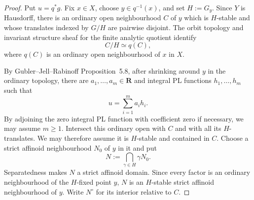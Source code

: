\begin{proof}
Put $u=q^*g$.  Fix $x\in X$, choose $y\in q^{-1}(x)$, and set
$H:=G_y$.  Since $Y$ is Hausdorff, there is an ordinary open neighbourhood
$C$ of $y$ which is $H$-stable and whose translates indexed by $G/H$ are
pairwise disjoint.  The orbit topology and invariant structure sheaf for the
finite analytic quotient identify
\begin{equation}\label{eq:p061-clean-local-quotient-candidate}
                         C/H\simeq q(C),
\end{equation}
where $q(C)$ is an ordinary open neighbourhood of $x$ in $X$.

By Gubler--Jell--Rabinoff Proposition~5.8, after shrinking around $y$ in the
ordinary topology, there are $a_1,\ldots,a_m\in\mathbf R$ and integral PL
functions $h_1,\ldots,h_m$ such that
\begin{equation}\label{eq:p061-local-rpl-decomposition-candidate}
                              u=\sum_{i=1}^m a_i h_i.
\end{equation}
By adjoining the zero integral PL function with coefficient zero if
necessary, we may assume $m\geq1$.
Intersect this ordinary open with $C$ and with all its $H$-translates.  We may
therefore assume it is $H$-stable and contained in $C$.  Choose a strict
affinoid neighbourhood $N_0$ of $y$ in it and put
\[
                          N:=\bigcap_{\gamma\in H}\gamma N_0.
\]
Separatedness makes $N$ a strict affinoid domain.  Since every factor is an
ordinary neighbourhood of the $H$-fixed point $y$, $N$ is an $H$-stable
strict affinoid neighbourhood of $y$.  Write $N^\circ$ for its interior
relative to $C$.


\end{proof}
